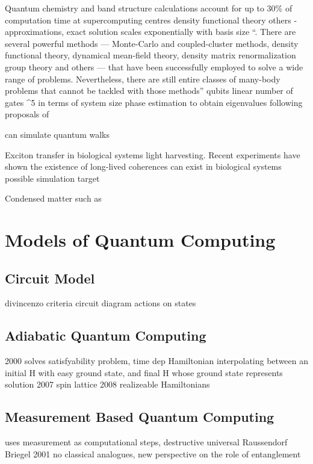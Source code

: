Quantum chemistry and band structure calculations account for up to 30\% of computation time at supercomputing centres \cite{simulation_photon_review, supercomputer_report_10}
density functional theory others - approximations, exact solution scales exponentially with basis size
``. There are several powerful methods — Monte-Carlo and coupled-cluster methods, density functional theory, dynamical mean-field theory, density matrix renormalization group theory and others — that have been successfully employed to solve a wide range of problems. Nevertheless, there are still entire classes of many-body problems that cannot be tackled with those methods''
\cite{quantum_chem_alg_05, simulation_hamiltonians_11} qubits linear number of gates ^5 in terms of system size phase estimation to obtain eigenvalues following proposals of \cite{lloyd_simulate_eigenvalues_99, lloyd_simulate_many_body_97}

can simulate quantum walks \cite{farhi_quantum_walks_98} \cite{quantum_walks_simulated_08}

Exciton transfer in biological systems light harvesting. Recent experiments have shown the existence of long-lived coherences can exist in biological systems \cite{quant_bio_coherences_1, quant_bio_coherences_2, quant_bio_coherences_3} possible simulation target

Condensed matter such as \cite{simulation_frustrated_spins_11}


\section{Models of Quantum Computing}

\subsection{Circuit Model}

divincenzo criteria
circuit diagram
actions on states

\subsection{Adiabatic Quantum Computing}
\cite{adiabatic_qc} 2000 solves satisfyability problem, time dep Hamiltonian interpolating between an initial H with easy ground state, and final H whose ground state represents solution
\cite{adiabatic_equivalent} 2007 spin lattice 
\cite{hamiltonians_for_adiabatic_qc} 2008 realizeable Hamiltonians

\subsection{Measurement Based Quantum Computing}
\cite{mbqc_intro} uses measurement as computational steps, destructive
universal
\cite{teleportation_universal}
\cite{one_way_qc} Raussendorf Briegel 2001
\cite{qc_by_measurement_03}
\cite{mbqc_cluster_03}
no classical analogues, new perspective on the role of entanglement

